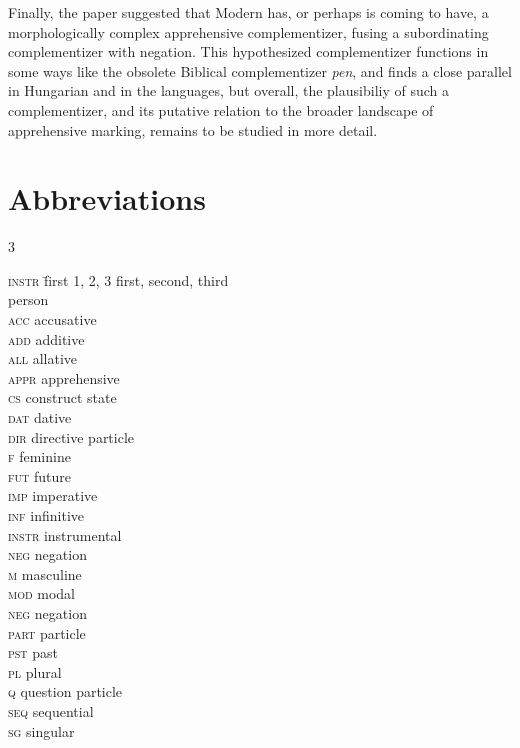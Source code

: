 \documentclass[output=paper,colorlinks,citecolor=brown]{langscibook}
\begin{document}
Finally, the paper suggested that Modern  has, or perhaps is coming to have, a morphologically complex apprehensive complementizer, fusing a subordinating complementizer with negation. This hypothesized complementizer functions in some ways like the obsolete Biblical complementizer \textit{pen}, and finds a close parallel in Hungarian and in the  languages, but overall, the plausibiliy of such a complementizer, and its putative relation to the broader landscape of apprehensive marking, remains to be studied in more detail. 


\section*{Abbreviations}
\begin{multicols}{3}
\begin{tabbing}
\textsc{instr} \= first\kill
\textsc{1, 2, 3} \> first, second, third \\
\> person \\
\textsc{acc} \> accusative \\
\textsc{add} \> additive \\
\textsc{all} \> allative \\
\textsc{appr} \> apprehensive \\
\textsc{cs} \> construct state \\
\textsc{dat} \> dative \\
\textsc{dir} \> directive particle \\
\textsc{f}   \> feminine \\
\textsc{fut} \> future \\
\textsc{imp} \> imperative \\
\textsc{inf} \> infinitive \\
\textsc{instr} \> instrumental \\
\textsc{neg} \> negation \\
\textsc{m} \> masculine\\
\textsc{mod} \> modal \\
\textsc{neg} \> negation \\
\textsc{part} \> particle \\
\textsc{pst} \> past \\
\textsc{pl} \> plural \\
\textsc{q} \> question particle \\
\textsc{seq} \> sequential \\
\textsc{sg} \> singular 
\end{tabbing}
\end{multicols}
\end{document}

